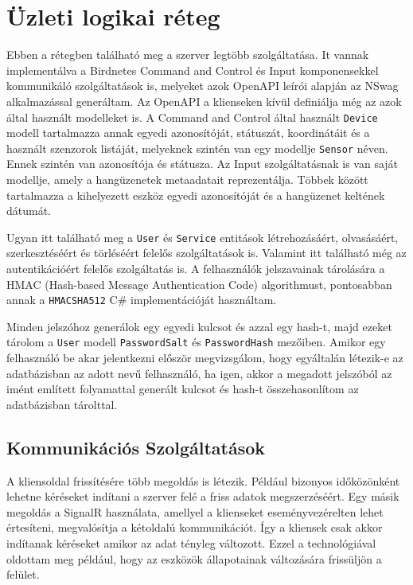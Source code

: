 \section{Üzleti logikai réteg}
Ebben a rétegben található meg a szerver legtöbb szolgáltatása. It vannak implementálva a Birdnetes Command and Control és Input komponensekkel kommunikáló szolgáltatások is, 
melyeket azok OpenAPI leírói alapján az NSwag\cite{nswag} alkalmazással generáltam. Az OpenAPI a klienseken kívül definiálja még az azok által használt modelleket is.
A Command and Control által használt \verb+Device+ modell tartalmazza annak egyedi azonosítóját, státuszát, koordinátáit és a használt szenzorok listáját, 
melyeknek szintén van egy modellje \verb+Sensor+ néven. Ennek szintén van azonosítója és státusza. Az Input szolgáltatásnak is van saját modellje, 
amely a hangüzenetek metaadatait reprezentálja. Többek között tartalmazza a kihelyezett eszköz egyedi azonosítóját és a hangüzenet keltének dátumát. 

Ugyan itt található meg a \verb+User+ és \verb+Service+ entitások létrehozásáért, olvasásáért, szerkesztéséért és törléséért felelős szolgáltatások is.
Valamint itt található még az autentikációért felelős szolgáltatás is. A felhasználók jelszavainak tárolására a HMAC (Hash-based Message Authentication Code) algorithmust, 
pontosabban annak a \verb+HMACSHA512+\cite{hmacsha512} C\# implementációját használtam.

Minden jelszóhoz generálok egy egyedi kulcsot és azzal egy hash-t, majd ezeket tárolom a \verb+User+ modell \verb+PasswordSalt+ és \verb+PasswordHash+ mezőiben.
Amikor egy felhasználó be akar jelentkezni először megvizsgálom, hogy egyáltalán létezik-e az adatbázisban az adott nevű felhasználó, 
ha igen, akkor a megadott jelszóból az imént említett folyamattal generált kulcsot és hash-t összehasonlítom az adatbázisban tárolttal.

\subsection{Kommunikációs Szolgáltatások}
A kliensoldal frissítésére több megoldás is létezik. Például bizonyos időközönként lehetne kéréseket indítani a szerver felé a friss adatok megszerzéséért.
Egy másik megoldás a SignalR használata, amellyel a klienseket eseményvezérelten lehet értesíteni, megvalósítja a kétoldalú kommunikációt.
Így a kliensek csak akkor indítanak kéréseket amikor az adat tényleg változott. Ezzel a technológiával oldottam meg például, hogy az eszközök állapotainak változására
frissüljön a felület.

